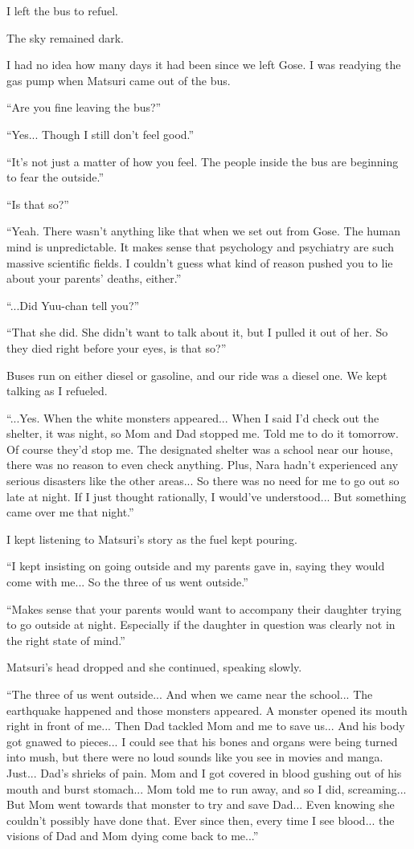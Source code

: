 I left the bus to refuel.

The sky remained dark.

I had no idea how many days it had been since we left Gose. I was readying the gas pump when Matsuri came out of the bus.

``Are you fine leaving the bus?''

``Yes... Though I still don't feel good.''

``It's not just a matter of how you feel. The people inside the bus are beginning to fear the outside.''

``Is that so?''

``Yeah. There wasn't anything like that when we set out from Gose. The human mind is unpredictable. It makes sense that psychology and psychiatry are such massive scientific fields. I couldn't guess what kind of reason pushed you to lie about your parents' deaths, either.''

``...Did Yuu-chan tell you?''

``That she did. She didn't want to talk about it, but I pulled it out of her. So they died right before your eyes, is that so?''

Buses run on either diesel or gasoline, and our ride was a diesel one. We kept talking as I refueled.

``...Yes. When the white monsters appeared... When I said I'd check out the shelter, it was night, so Mom and Dad stopped me. Told me to do it tomorrow. Of course they'd stop me. The designated shelter was a school near our house, there was no reason to even check anything. Plus, Nara hadn't experienced any serious disasters like the other areas... So there was no need for me to go out so late at night. If I just thought rationally, I would've understood... But something came over me that night.''

I kept listening to Matsuri's story as the fuel kept pouring.

``I kept insisting on going outside and my parents gave in, saying they would come with me... So the three of us went outside.''

``Makes sense that your parents would want to accompany their daughter trying to go outside at night. Especially if the daughter in question was clearly not in the right state of mind.''

Matsuri's head dropped and she continued, speaking slowly.

``The three of us went outside... And when we came near the school... The earthquake happened and those monsters appeared. A monster opened its mouth right in front of me... Then Dad tackled Mom and me to save us... And his body got gnawed to pieces... I could see that his bones and organs were being turned into mush, but there were no loud sounds like you see in movies and manga. Just... Dad's shrieks of pain. Mom and I got covered in blood gushing out of his mouth and burst stomach... Mom told me to run away, and so I did, screaming... But Mom went towards that monster to try and save Dad... Even knowing she couldn't possibly have done that. Ever since then, every time I see blood... the visions of Dad and Mom dying come back to me...''

